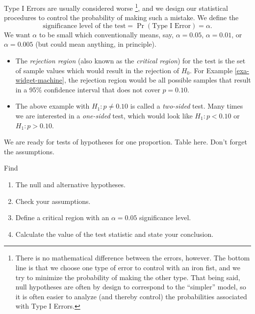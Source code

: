 \documentclass[captions=tableheading]{scrbook}
\begin{document}
Type I Errors are usually considered worse
\footnote{There is no mathematical difference between the errors, however. The bottom line is that we choose one type of error to control with an iron fist, and we try to minimize the probability of making the other type. That being said, null hypotheses are often by design to correspond to the ``simpler'' model, so it is often easier to analyze (and thereby control) the probabilities associated with Type I Errors.}, 
and we design our statistical procedures to control the probability of making such a mistake. We define the
\begin{equation}
\mbox{significance level of the test}=\Pr(\mbox{Type I Error})=\alpha.
\end{equation}
We want \(\alpha\) to be small which conventionally means, say, \(\alpha=0.05\), \(\alpha=0.01\), or \(\alpha=0.005\) (but could mean anything, in principle).
\begin{itemize}
\item The \emph{rejection region} (also known as the \emph{critical region}) for the test is the set of sample values which would result in the rejection of \(H_{0}\). For Example \ref{exa-widget-machine}, the rejection region would be all possible samples that result in a 95\% confidence interval that does not cover \(p=0.10\).
\item The above example with \(H_{1}:p\neq0.10\) is called a \emph{two-sided} test. Many times we are interested in a \emph{one-sided} test, which would look like \(H_{1}:p<0.10\) or \(H_{1}:p>0.10\).
\end{itemize}

We are ready for tests of hypotheses for one proportion.
Table here.
Don't forget the assumptions.

\begin{example}
Find
\begin{enumerate}
\item The null and alternative hypotheses.
\item Check your assumptions.
\item Define a critical region with an \(\alpha=0.05\) significance level.
\item Calculate the value of the test statistic and state your conclusion.
\end{enumerate}
\end{example}
\end{document}

